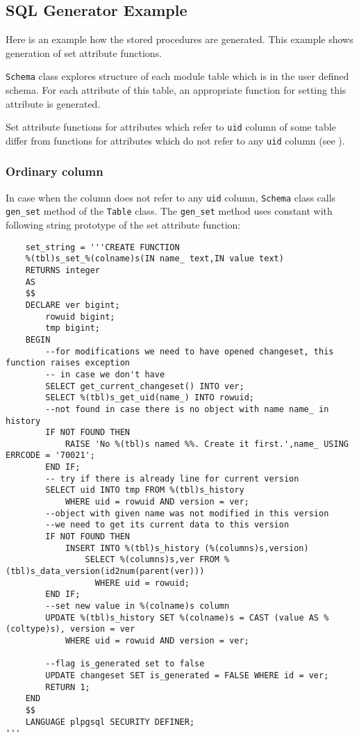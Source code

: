 \documentclass[deska]{subfiles}
\begin{document}
\subsection{SQL Generator Example}
\label{sec:sql-gen-example}

Here is an example how the stored procedures are generated.  This example shows generation of set attribute functions.

{\tt Schema} class explores structure of each module table which is in the user defined schema. For each attribute of
this table, an appropriate function for setting this attribute is generated.

Set attribute functions for attributes which refer to {\tt uid} column of some table differ from functions for
attributes which do not refer to any {\tt uid} column (see ).

\subsubsection{Ordinary column}
In case when the column does not refer to any {\tt uid} column, {\tt Schema} class calls {\tt gen\_set} method of the
{\tt Table} class. The {\tt gen\_set} method uses constant with following string prototype of the set attribute
function:

\begin{verbatim}
    set_string = '''CREATE FUNCTION 
    %(tbl)s_set_%(colname)s(IN name_ text,IN value text)
    RETURNS integer
    AS
    $$
    DECLARE ver bigint;
        rowuid bigint;
        tmp bigint;
    BEGIN
        --for modifications we need to have opened changeset, this function raises exception
        -- in case we don't have
        SELECT get_current_changeset() INTO ver;
        SELECT %(tbl)s_get_uid(name_) INTO rowuid;
        --not found in case there is no object with name name_ in history
        IF NOT FOUND THEN
            RAISE 'No %(tbl)s named %%. Create it first.',name_ USING ERRCODE = '70021';
        END IF;
        -- try if there is already line for current version
        SELECT uid INTO tmp FROM %(tbl)s_history
            WHERE uid = rowuid AND version = ver;
        --object with given name was not modified in this version
        --we need to get its current data to this version
        IF NOT FOUND THEN
            INSERT INTO %(tbl)s_history (%(columns)s,version)
                SELECT %(columns)s,ver FROM %(tbl)s_data_version(id2num(parent(ver)))
                  WHERE uid = rowuid;
        END IF;
        --set new value in %(colname)s column
        UPDATE %(tbl)s_history SET %(colname)s = CAST (value AS %(coltype)s), version = ver
            WHERE uid = rowuid AND version = ver;

        --flag is_generated set to false
        UPDATE changeset SET is_generated = FALSE WHERE id = ver;
        RETURN 1;
    END
    $$
    LANGUAGE plpgsql SECURITY DEFINER;
'''
\end{verbatim}
\end{document}
